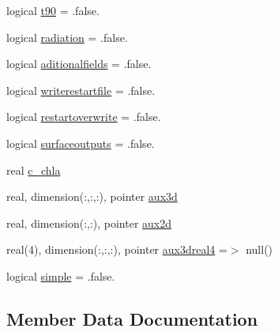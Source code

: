 \begin{DoxyCompactItemize}
logical \mbox{\hyperlink{structmodulewaterproperties_1_1t__output_ab90a19d0c6f43f9f359e17ae4edeab51}{t90}} = .false.
\item 
logical \mbox{\hyperlink{structmodulewaterproperties_1_1t__output_a5d521f236732e5ec624ca698b806ff38}{radiation}} = .false.
\item 
logical \mbox{\hyperlink{structmodulewaterproperties_1_1t__output_a062139456d5ed268a88327077ac3ef27}{aditionalfields}} = .false.
\item 
logical \mbox{\hyperlink{structmodulewaterproperties_1_1t__output_a060a807c25b3170addcffae82aad0f03}{writerestartfile}} = .false.
\item 
logical \mbox{\hyperlink{structmodulewaterproperties_1_1t__output_adb8c809ff4338718334da97002e0c8f5}{restartoverwrite}} = .false.
\item 
logical \mbox{\hyperlink{structmodulewaterproperties_1_1t__output_a24ee1acf3a502fef756eae4348a4633a}{surfaceoutputs}} = .false.
\item 
real \mbox{\hyperlink{structmodulewaterproperties_1_1t__output_a03ffd505c37d80c692a52f0c938b3e22}{c\+\_\+chla}}
\item 
real, dimension(\+:,\+:,\+:), pointer \mbox{\hyperlink{structmodulewaterproperties_1_1t__output_a4ce642f0b4fb2a132908fb0d02d07dbf}{aux3d}}
\item 
real, dimension(\+:,\+:), pointer \mbox{\hyperlink{structmodulewaterproperties_1_1t__output_a9f5c47d0c5ca39ea6a36dc9d3c04bc11}{aux2d}}
\item 
real(4), dimension(\+:,\+:,\+:), pointer \mbox{\hyperlink{structmodulewaterproperties_1_1t__output_a1256f37ad9c840d31ffa9ddc4a37799b}{aux3dreal4}} =$>$ null()
\item 
logical \mbox{\hyperlink{structmodulewaterproperties_1_1t__output_ab90eae5379ebec679e760d0fc1f66968}{simple}} = .false.
\end{DoxyCompactItemize}


\subsection{Member Data Documentation}
\mbox{\label{structmodulewaterproperties_1_1t__output_a062139456d5ed268a88327077ac3ef27}} 
